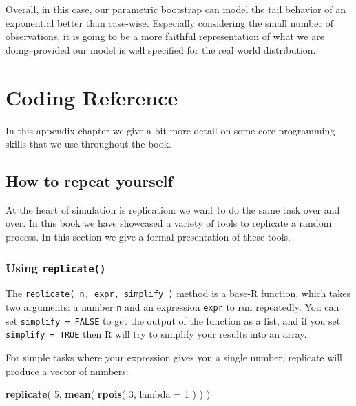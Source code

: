 \documentclass[
]{book}
\newenvironment{Shaded}{\begin{snugshade}}{\end{snugshade}}
\newcommand{\AttributeTok}[1]{\textcolor[rgb]{0.13,0.29,0.53}{#1}}
\newcommand{\DecValTok}[1]{\textcolor[rgb]{0.00,0.00,0.81}{#1}}
\newcommand{\FunctionTok}[1]{\textcolor[rgb]{0.13,0.29,0.53}{\textbf{#1}}}
\newcommand{\NormalTok}[1]{#1}
\begin{document}
Overall, in this case, our parametric bootstrap can model the tail behavior of an exponential better than case-wise.
Especially considering the small number of observations, it is going to be a more faithful representation of what we are doing--provided our model is well specified for the real world distribution.

\appendix


\chapter{Coding Reference}\label{coding-tidbits}

In this appendix chapter we give a bit more detail on some core programming skills that we use throughout the book.

\section{How to repeat yourself}\label{more-repeating-oneself}

At the heart of simulation is replication: we want to do the same task over and over. In this book we have showcased a variety of tools to replicate a random process. In this section we give a formal presentation of these tools.

\subsection{\texorpdfstring{Using \texttt{replicate()}}{Using replicate()}}\label{using-replicate}

The \texttt{replicate(\ n,\ expr,\ simplify\ )} method is a base-R function, which takes two arguments: a number \texttt{n} and an expression \texttt{expr} to run repeatedly. You can set \texttt{simplify\ =\ FALSE} to get the output of the function as a list, and if you set \texttt{simplify\ =\ TRUE} then R will try to simplify your results into an array.

For simple tasks where your expression gives you a single number, replicate will produce a vector of numbers:

\begin{Shaded}
\begin{Highlighting}[]
\FunctionTok{replicate}\NormalTok{( }\DecValTok{5}\NormalTok{, }\FunctionTok{mean}\NormalTok{( }\FunctionTok{rpois}\NormalTok{( }\DecValTok{3}\NormalTok{, }\AttributeTok{lambda =} \DecValTok{1}\NormalTok{ ) ) )}
\end{Highlighting}
\end{Shaded}
\end{document}
